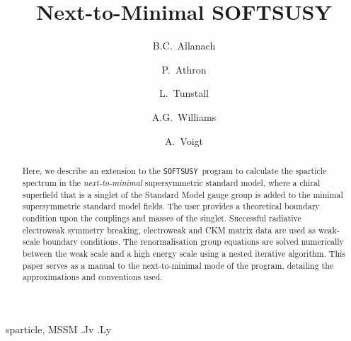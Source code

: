 \documentclass[final,3p,times,pdflatex]{elsarticle}
\begin{document}
\begin{frontmatter}

\title{Next-to-Minimal SOFTSUSY}

\author{B.C.~Allanach}
\address{DAMTP, CMS, University of Cambridge, Wilberforce road, Cambridge, CB3
  0WA, United Kingdom}

\author{P.~Athron}
\author{L.~Tunstall}
\author{A.G.~Williams}
\address{Department of Physics, North Terrace, University of Adelaide,
  Adelaide SA 5005, Australia}

\author{A.~Voigt}
\address{Dipl.-Phys. Alexander Voigt,
Institut für Kern- und Teilchenphysik,
Helmholtzstraße 10, 
D-01069 Dresden,
Germany}
\begin{abstract}
  Here, we describe an extension to the
  {\tt SOFTSUSY}~program to calculate the sparticle spectrum in the
  {\em next-to-minimal} supersymmetric standard model, where a chiral
  superfield that is a singlet of the Standard Model gauge group is added to
  the minimal supersymmetric standard model fields. 
  The user provides a theoretical boundary condition upon the couplings and
  masses of the singlet.
  Successful radiative electroweak symmetry breaking,
  electroweak and CKM matrix data are used
  as weak-scale boundary conditions. 
  The renormalisation group equations are solved
  numerically between the weak scale and a high energy scale using a nested
  iterative algorithm. 
  This paper serves as a manual to the
  next-to-minimal mode of the program, detailing the approximations and
  conventions used. 
\end{abstract}

\begin{keyword}
sparticle, 
MSSM
.Jv
.Ly
\end{keyword}
\end{frontmatter}
\end{document}
